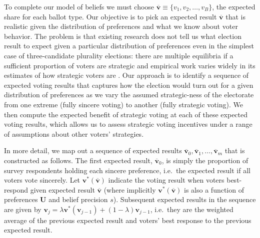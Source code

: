 \documentclass[11pt,a4paper]{article}
\begin{document}
To complete our model of beliefs we must choose $\overline{\mathbf{v}} \equiv \{v_1, v_2, \ldots, v_B\}$, the expected share for each ballot type. Our objective is to pick an expected result $\overline{\mathbf{v}}$ that is realistic given the distribution of preferences and what we know about voter behavior. The problem is that existing research does not tell us what election result to expect given a particular distribution of preferences even in the simplest case of three-candidate plurality elections: there are multiple equilibria if a sufficient proportion of voters are strategic \citep[e.g.][]{myerson1993theory} and empirical work varies widely in its estimates of how strategic voters are \citep[e.g.][]{kawai2013inferring,fisher2017strategic}. Our approach is to identify a sequence of expected voting results that captures how the election would turn out for a given distribution of preferences as we vary the assumed strategic-ness of the electorate from one extreme (fully sincere voting) to another (fully strategic voting). We then compute the expected benefit of strategic voting at each of these expected voting results, which allows us to assess strategic voting incentives under a range of assumptions about other voters' strategies. 

In more detail, we map out a sequence of expected results $\overline{\mathbf{v}}_0, \overline{\mathbf{v}}_1, \ldots, \overline{\mathbf{v}}_m$ that is constructed as follows. The first expected result, $\overline{\mathbf{v}}_0$, is simply the proportion of survey respondents holding each sincere preference, i.e.\ the expected result if all voters vote sincerely.  Let $\mathbf{v}^*(\overline{\mathbf{v}})$ indicate the voting result when voters best-respond given expected result $\overline{\mathbf{v}}$ (where implicitly $\textbf{v}^*(\overline{\mathbf{v}})$ is also a function of preferences $\mathbf{U}$ and belief precision $s$). Subsequent expected results in the sequence are given by $\mathbf{v}_{j} = \lambda \mathbf{v}^*(\mathbf{v}_{j-1}) + (1 - \lambda) \textbf{v}_{j-1}$, i.e.\ they are the weighted average of the previous expected result and voters' best response to the previous expected result. 
\end{document}
